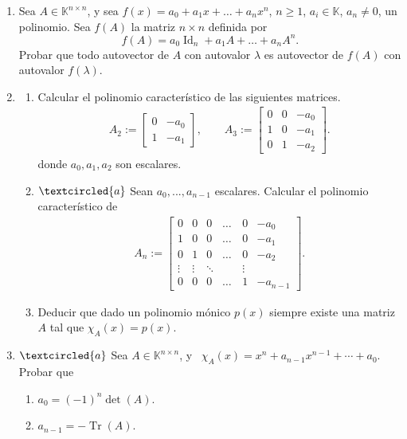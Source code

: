\begin{enumerate}[resume,topsep=6pt,itemsep=.4cm]


\item Sea $A\in\mathbb{K}^{n\times n}$, y sea $f(x) = a_0 + a_1 x + \dots + a_nx^n$, $n \geq 1$, $a_i\in\mathbb{K}$, $a_n \neq 0$, un polinomio. Sea $f(A)$ la matriz $n \times n$ definida por
$$f(A) = a_0 \operatorname{Id}_n + a_1 A + \dots + a_n A^n.$$
Probar que todo autovector de $A$ con autovalor $\lambda$ es autovector de $f(A)$ con autovalor $f(\lambda)$.


\item\label{caracteristico-otro} 

\begin{enumerate}
\item  Calcular el polinomio característico de las siguientes matrices.
\begin{align*}
A_2 := \begin{bmatrix} 0 & -a_0 \\ 1 & -a_1
\end{bmatrix},\quad\quad
A_3 := \begin{bmatrix} 0 & 0 & -a_0 \\ 1 & 0 & -a_1 \\ 0 & 1 & -a_2
\end{bmatrix}.
\end{align*}
donde $a_0, a_1, a_2$ son escalares.

\item\label{matriz de un polinomio} $\textcircled{a}$ Sean $a_0, ..., a_{n-1}$ escalares. Calcular el polinomio característico de
\begin{align*}
A_n := \begin{bmatrix} 0 & 0 & 0 &\dots & 0 & -a_0 \\ 1 & 0 & 0&  \dots & 0  & -a_1 \\ 0 & 1 & 0&  \dots & 0  & -a_2 \\ \vdots & \vdots & \ddots & \quad  & \vdots\\ 0 & 0 & 0 & \dots & 1  & -a_{n-1}
\end{bmatrix}.        
 \end{align*}

 \item Deducir que dado un polinomio mónico $p(x)$ siempre existe una matriz $A$ tal que $\chi_A(x)=p(x)$.
\end{enumerate}


\item\label{tr det}$\textcircled{a}$ 
Sea $A\in\mathbb{K}^{n\times n}$, y \ $\chi_A(x) = x^n+a_{n-1}x^{n-1}+\cdots+a_0$. Probar que
\begin{enumerate}
    \item\label{tr det a} $a_0 = (-1)^n \det(A)$.
    \item\label{tr det b} $a_{n-1} = - \operatorname{Tr}(A)$.
\end{enumerate}



\end{enumerate}
